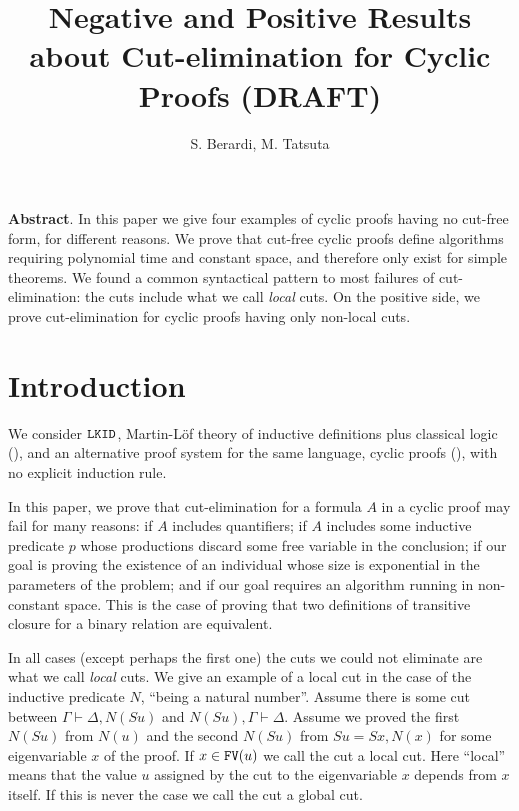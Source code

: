 \documentclass[a4paper,12pt]{article}
\newcommand{\FV}              { {\tt FV} }
\newcommand{\LKID} { {\tt LKID} }
\begin{document}
\title{Negative and Positive Results about Cut-elimination for Cyclic Proofs (DRAFT)}

\author{S. Berardi, M. Tatsuta}


\maketitle

{\bf Abstract}.
In this paper we  give four examples of cyclic proofs having no cut-free form, for different reasons. We prove that cut-free  cyclic proofs define algorithms requiring polynomial time and constant space, and therefore only exist for simple theorems.  We found a common syntactical pattern to most failures of cut-elimination: the cuts include what we call \emph{local} cuts. On the positive side, we prove cut-elimination for cyclic proofs having only non-local cuts. 



\section{Introduction}
We consider $\LKID$,  Martin-L\"{o}f theory of inductive definitions plus classical logic (\cite{FOSSACS2017}), and an alternative proof system for the same language, cyclic proofs (\cite{Brotherston2006}), with no explicit induction rule. 

In this paper, we prove that cut-elimination for a formula $A$ in a cyclic proof may fail for many reasons: if $A$ includes quantifiers; if $A$ includes some inductive predicate $p$ whose productions discard some free variable in the conclusion; if our goal is proving the existence of an individual whose size is exponential in the parameters of the problem; and if our goal requires an algorithm running in non-constant space. This is the case of proving that two definitions of transitive closure for a binary relation are equivalent. 

In all cases (except perhaps the first one) the cuts we could not eliminate are what we call \emph{local} cuts. We give an example of a local cut in the case of the inductive predicate $N$, ``being a natural number''. Assume there is some cut between $\Gamma \vdash \Delta, N(Su)$ and $N(Su), \Gamma \vdash \Delta$. Assume we proved the first $N(Su)$ from $N(u)$ and the second $N(Su)$ from $Su=Sx, N(x)$ for some eigenvariable $x$ of the proof. If $x \in \FV(u)$ we call the cut  a local cut. Here ``local'' means that the value $u$ assigned by the cut to the eigenvariable $x$ depends from $x$ itself. If this is never the case we call the cut a global cut.
\end{document}
